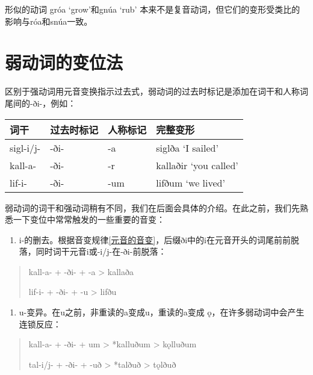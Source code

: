 形似的动词 gróa `grow‌'和gnúa `rub‌'
本来不是复音动词，但它们的变形受类比的影响与róa和snúa一致。

\section{弱动词的变位法}\label{弱动词的变位法}

区别于强动词用元音变换指示过去式，弱动词的过去时标记是添加在词干和人称词尾间的-ði-，例如：

\begin{longtable}{llll}
  \toprule
  词干        & 过去时标记 & 人称标记 & 完整变形                  \\
  \midrule
  \endhead
  \bottomrule
  \endfoot
  sigl-i/j- & -ði-  & -a   & siglða `I sailed‌'     \\
  kall-a-   & -ði-  & -r   & kallaðir `you called‌' \\
  lif-i-    & -ði-  & -um  & lifðum `we lived‌'     \\
\end{longtable}

弱动词的词干和强动词稍有不同，我们在后面会具体的介绍。在此之前，我们先熟悉一下变位中常常触发的一些重要的音变：

\begin{enumerate}
  \def\labelenumi{\arabic{enumi})}
  \item
        i-的删去。根据音变规律\ref{元音的音变}，后缀ði中的i在元音开头的词尾前前脱落，同时词干元音i或-i/j-在-ði-前脱落：
\end{enumerate}

\begin{quote}
  kall-a- + -ði- + -a \textgreater{} kallaða

  lif-i- + -ði- + -u \textgreater{} lifðu
\end{quote}

\begin{enumerate}
  \def\labelenumi{\arabic{enumi})}
  \setcounter{enumi}{1}
  \item
        u-变异。在u之前，非重读的a变成u，重读的a变成
        ǫ，在许多弱动词中会产生连锁反应：
\end{enumerate}

\begin{quote}
  kall-a- + -ði- + um \textgreater{} *kalluðum \textgreater{} kǫlluðum

  tal-i/j- + -ði- + -uð \textgreater{} *talðuð \textgreater{} tǫlðuð
\end{quote}

